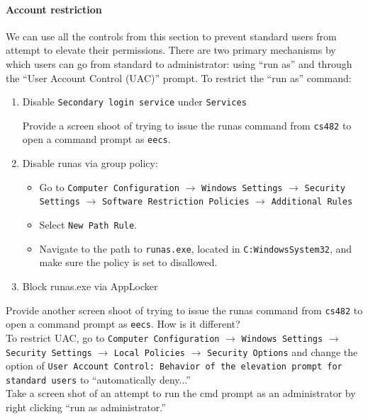 \documentclass{article}
\begin{document}
\paragraph{Account restriction} 
We can use all the controls from this section to prevent standard users from attempt to elevate their permissions.  There are two primary mechanisms by which users can go from standard to administrator: using ``run as'' and through the ``User Account Control (UAC)'' prompt.  To restrict the ``run as'' command:
\begin{enumerate}

\item Disable {\tt Secondary login service} under {\tt Services}

\question Provide a screen shoot of trying to issue the runas command from {\tt cs482} to open a command prompt as {\tt eecs}. 

\item Disable runas via group policy:
\begin{itemize}
\item Go to {\tt Computer Configuration} $\rightarrow$ {\tt Windows Settings} $\rightarrow$
{\tt Security Settings} $\rightarrow$
{\tt Software Restriction Policies} $\rightarrow$
{\tt Additional Rules} 
\item Select {\tt New Path Rule}. 
\item Navigate to the path to {\tt runas.exe}, located in {\tt C:\texttt{}Windows\texttt{}System32}, and make sure the policy is set to disallowed. 
\end{itemize}
\item Block {runas.exe} via AppLocker
\end{enumerate}

\question Provide another screen shoot of trying to issue the runas command from {\tt cs482} to open a command prompt as {\tt eecs}. How is it different?\\

To restrict UAC, go to {\tt Computer Configuration} $\rightarrow$ {\tt Windows Settings} $\rightarrow$
{\tt Security Settings} $\rightarrow$
{\tt Local Policies} $\rightarrow$
{\tt Security Options} and change the option of {\tt User Account Control: Behavior of the elevation prompt for standard users} to ``automatically deny...''\\

\question Take a screen shot of an attempt to run the cmd prompt as an administrator by right clicking ``run as administrator.''
\end{document}
